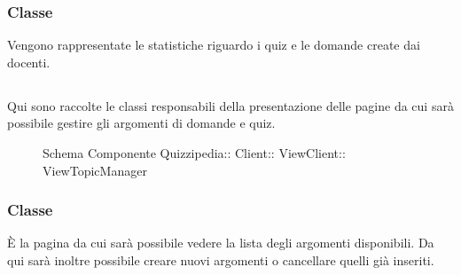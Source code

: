 \subsubsection{Classe }
Vengono rappresentate le statistiche riguardo i quiz e le domande create dai docenti.
\begin{itemize}
\end{itemize}
\subsection{}
Qui sono raccolte le classi responsabili della presentazione delle pagine da cui sarà possibile gestire gli argomenti di domande e quiz.
\begin{figure}[H]
\centering
\noindent{}
\caption[Schema Componente ViewTopicManager]{Schema Componente Quizzipedia:: Client:: ViewClient:: ViewTopicManager}
\end{figure}
\subsubsection{Classe }
È la pagina da cui sarà possibile vedere la lista degli argomenti disponibili. Da qui sarà inoltre possibile creare nuovi argomenti o cancellare quelli già inseriti.
\begin{itemize}
\end{itemize}

